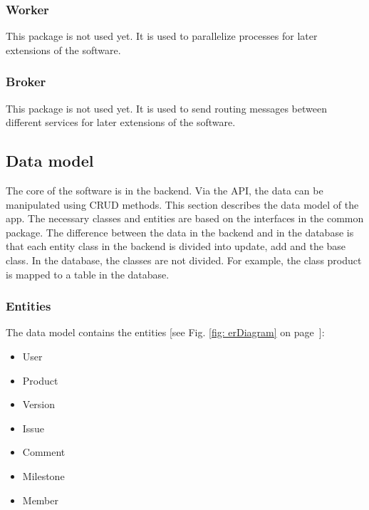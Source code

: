     \subsubsection*{Worker}
    This package is not used yet. It is used to parallelize processes for later extensions of the software.
    
    \subsubsection*{Broker}
    This package is not used yet. It is used to send routing messages between different services for later extensions of the software.

    \subsection*{Data model}
    The core of the software is in the backend. Via the API, the data can be manipulated using CRUD methods. This section describes the data model of the app. The necessary classes and entities are based on the interfaces in the common package. The difference between the data in the backend and in the database is that each entity class in the backend is divided into update, add and the base class. In the database, the classes are not divided. For example, the class product is mapped to a table in the database.
    
    \subsubsection*{Entities}
    The data model contains the entities [see Fig. \ref{fig: erDiagram} on page~\pageref{fig: erDiagram}]:
    \begin{itemize}
        \item User
        \item Product
        \item Version
        \item Issue
        \item Comment
        \item Milestone
        \item Member
    \end{itemize}

